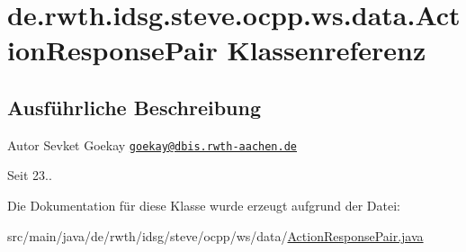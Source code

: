 \hypertarget{classde_1_1rwth_1_1idsg_1_1steve_1_1ocpp_1_1ws_1_1data_1_1_action_response_pair}{\section{de.\-rwth.\-idsg.\-steve.\-ocpp.\-ws.\-data.\-Action\-Response\-Pair Klassenreferenz}
\label{classde_1_1rwth_1_1idsg_1_1steve_1_1ocpp_1_1ws_1_1data_1_1_action_response_pair}
}


\subsection{Ausführliche Beschreibung}
\begin{DoxyAuthor}{Autor}
Sevket Goekay \href{mailto:goekay@dbis.rwth-aachen.de}{\tt goekay@dbis.\-rwth-\/aachen.\-de} 
\end{DoxyAuthor}
\begin{DoxySince}{Seit}
23.. 
\end{DoxySince}


Die Dokumentation für diese Klasse wurde erzeugt aufgrund der Datei\-:\begin{DoxyCompactItemize}
\item 
src/main/java/de/rwth/idsg/steve/ocpp/ws/data/\hyperlink{_action_response_pair_8java}{Action\-Response\-Pair.\-java}\end{DoxyCompactItemize}

